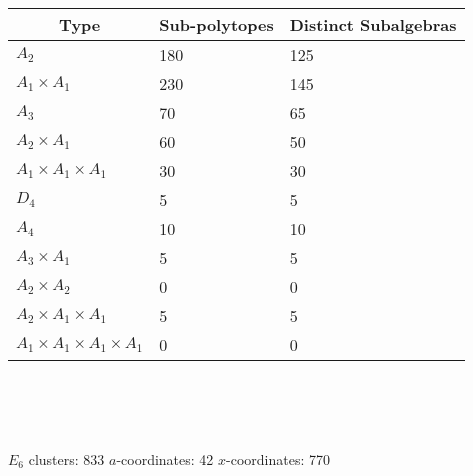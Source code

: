 \documentclass[12pt]{article}
\begin{document}
\begin{tabular}{ | l | l | l |}
\multicolumn{1}{c}{Type} &  \multicolumn{1}{c}{Sub-polytopes}  &  \multicolumn{1}{c}{Distinct Subalgebras} \\
\hline \(A_2\) & 180 & 125 \\ 
\hline \(A_1 \times A_1\) & 230 & 145 \\ \hline 
\hline \(A_3\) & 70 & 65 \\ 
\hline \(A_2 \times A_1\) & 60 & 50 \\ 
\hline \(A_1 \times A_1 \times A_1\) & 30 & 30 \\ \hline 
\hline \(D_4\) & 5 & 5 \\ 
\hline \(A_4\) & 10 & 10 \\ 
\hline \(A_3 \times A_1\) & 5 & 5 \\ 
\hline \(A_2 \times A_2\) & 0 & 0 \\ 
\hline \(A_2 \times A_1 \times A_1\) & 5 & 5 \\ 
\hline \(A_1 \times A_1 \times A_1 \times A_1\) & 0 & 0 \\ 
\hline
\end{tabular} \\ \\ \\

\pagebreak

{\Huge\underline{\(E_6\)}} \quad clusters: 833 \qquad \(a\)-coordinates: 42 \qquad \(x\)-coordinates: 770\\
\end{document}
